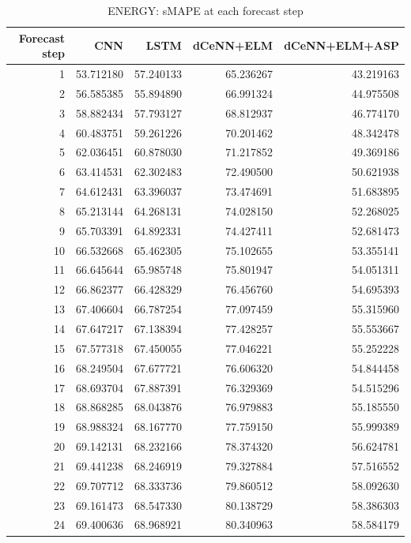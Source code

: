 \begin{table}
\caption{ENERGY: sMAPE at each forecast step}
\begin{tabular}{rrrrr}
\toprule
Forecast step & CNN & LSTM & dCeNN+ELM & dCeNN+ELM+ASP \\
\midrule
1 & 53.712180 & 57.240133 & 65.236267 & 43.219163 \\
2 & 56.585385 & 55.894890 & 66.991324 & 44.975508 \\
3 & 58.882434 & 57.793127 & 68.812937 & 46.774170 \\
4 & 60.483751 & 59.261226 & 70.201462 & 48.342478 \\
5 & 62.036451 & 60.878030 & 71.217852 & 49.369186 \\
6 & 63.414531 & 62.302483 & 72.490500 & 50.621938 \\
7 & 64.612431 & 63.396037 & 73.474691 & 51.683895 \\
8 & 65.213144 & 64.268131 & 74.028150 & 52.268025 \\
9 & 65.703391 & 64.892331 & 74.427411 & 52.681473 \\
10 & 66.532668 & 65.462305 & 75.102655 & 53.355141 \\
11 & 66.645644 & 65.985748 & 75.801947 & 54.051311 \\
12 & 66.862377 & 66.428329 & 76.456760 & 54.695393 \\
13 & 67.406604 & 66.787254 & 77.097459 & 55.315960 \\
14 & 67.647217 & 67.138394 & 77.428257 & 55.553667 \\
15 & 67.577318 & 67.450055 & 77.046221 & 55.252228 \\
16 & 68.249504 & 67.677721 & 76.606320 & 54.844458 \\
17 & 68.693704 & 67.887391 & 76.329369 & 54.515296 \\
18 & 68.868285 & 68.043876 & 76.979883 & 55.185550 \\
19 & 68.988324 & 68.167770 & 77.759150 & 55.999389 \\
20 & 69.142131 & 68.232166 & 78.374320 & 56.624781 \\
21 & 69.441238 & 68.246919 & 79.327884 & 57.516552 \\
22 & 69.707712 & 68.333736 & 79.860512 & 58.092630 \\
23 & 69.161473 & 68.547330 & 80.138729 & 58.386303 \\
24 & 69.400636 & 68.968921 & 80.340963 & 58.584179 \\
\bottomrule
\end{tabular}
\end{table}
